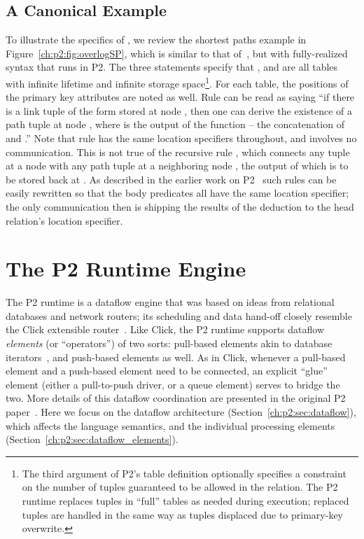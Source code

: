 \subsection{A Canonical Example}
\label{ch:p2:sec:declnet}

To illustrate the specifics of \OVERLOG, we review the shortest paths example
in Figure~\ref{ch:p2:fig:overlogSP}, which is similar to that
of~\cite{loo-sigmod06}, but with fully-realized \OVERLOG syntax that runs in
P2.  The three  statements specify that , 
and  are all tables with infinite lifetime and infinite storage
space\footnote{The third argument of P2's table definition optionally specifies
a constraint on the number of tuples guaranteed to be allowed in the relation.
The P2 runtime replaces tuples in ``full'' tables as needed during execution;
replaced tuples are handled in the same way as tuples displaced due to
primary-key overwrite.}.  For each table, the positions of the primary key
attributes are noted as well.  Rule  can be read as saying ``if there is
a link tuple of the form  stored at node , then one can
derive the existence of a path tuple  at node , where
 is the output of the function  -- the concatenation of
 and .'' Note that rule  has the same location specifiers
throughout, and involves no communication.  This is not true of the recursive
rule , which connects any  tuple at a node  with any path
tuple at a neighboring node , the output of which is to be stored back at
.  As described in the earlier work on
P2~\cite{loo-sigcomm05,loo-sigmod06} such rules can be easily rewritten so that
the body predicates all have the same location specifier; the only
communication then is shipping the results of the deduction to the head
relation's location specifier.

\section{The P2 Runtime Engine}
\label{ch:p2:sec:p2}

The P2 runtime is a dataflow engine that was based on ideas from relational
databases and network routers; its scheduling and data hand-off closely
resemble the Click extensible router~\cite{click-tocs}.  Like Click, the P2
runtime supports dataflow {\em elements} (or ``operators'') of two sorts:
pull-based elements akin to database iterators~\cite{graefe-survey}, and
push-based elements as well.  As in Click, whenever a pull-based element and a
push-based element need to be connected, an explicit ``glue'' element (either a
pull-to-push driver, or a queue element) serves to bridge the two.  More
details of this dataflow coordination are presented in the original P2
paper~\cite{p2:sosp}.  Here we focus on the dataflow architecture
(Section~\ref{ch:p2:sec:dataflow}), which affects the language semantics, and
the individual processing elements (Section~\ref{ch:p2:sec:dataflow_elements}).

